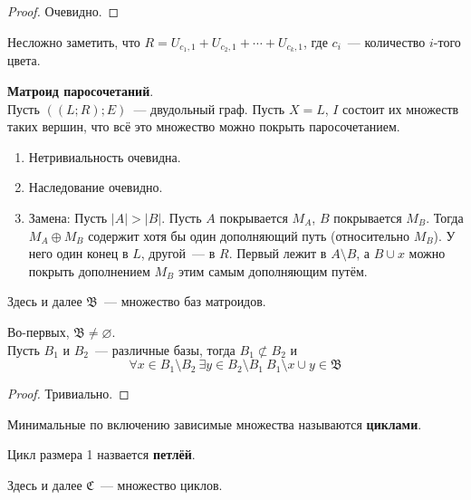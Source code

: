 \documentclass{article}
\begin{document}
    \begin{proof}
        Очевидно.
    \end{proof}
    \begin{remark}
        Несложно заметить, что $R=U_{c_1,1}+U_{c_2,1}+\cdots+U_{c_k,1}$, где $c_i$~--- количество $i$-того цвета.
    \end{remark}
    \begin{example}
        \textbf{Матроид паросочетаний}.\\
        Пусть $((L;R);E)$~--- двудольный граф. Пусть $X=L$, $I$ состоит их множеств таких вершин, что всё это множество можно покрыть паросочетанием.
        \begin{enumerate}
            \item Нетривиальность очевидна.
            \item Наследование очевидно.
            \item Замена: Пусть $|A|>|B|$. Пусть $A$ покрывается $M_A$, $B$ покрывается $M_B$. Тогда $M_A\oplus M_B$ содержит хотя бы один дополняющий путь (относительно $M_B$). У него один конец в $L$, другой~--- в $R$. Первый лежит в $A\setminus B$, а $B\cup x$ можно покрыть дополнением $M_B$ этим самым дополняющим путём.
        \end{enumerate}
    \end{example}
    \begin{remark}
        Здесь и далее $\mathfrak B$~--- множество баз матроидов.
    \end{remark}
    \begin{theorem}
        Во-первых, $\mathfrak B\neq\varnothing$.\\
        Пусть $B_1$ и $B_2$~--- различные базы, тогда $B_1\not\subset B_2$ и
        $$
        \forall x\in B_1\setminus B_2~\exists y\in B_2\setminus B_1~B_1\setminus x\cup y\in\mathfrak B
        $$
    \end{theorem}
    \begin{proof}
        Тривиально.
    \end{proof}
    \begin{definition}
        Минимальные по включению зависимые множества называются \textbf{циклами}.
    \end{definition}
    \begin{definition}
        Цикл размера 1 назвается \textbf{петлёй}.
    \end{definition}
    \begin{remark}
        Здесь и далее $\mathfrak C$~--- множество циклов.
    \end{remark}
\end{document}
